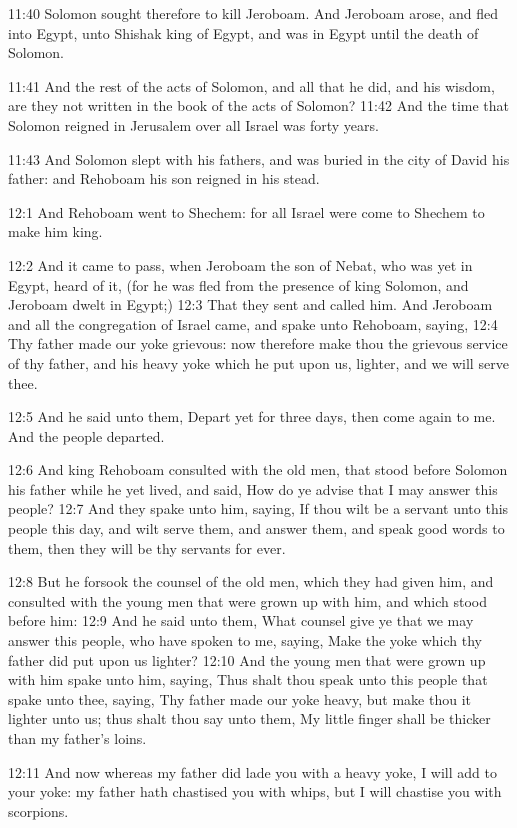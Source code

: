 11:40 Solomon sought therefore to kill Jeroboam. And Jeroboam arose,
and fled into Egypt, unto Shishak king of Egypt, and was in Egypt
until the death of Solomon.

11:41 And the rest of the acts of Solomon, and all that he did, and
his wisdom, are they not written in the book of the acts of Solomon?
11:42 And the time that Solomon reigned in Jerusalem over all Israel
was forty years.

11:43 And Solomon slept with his fathers, and was buried in the city
of David his father: and Rehoboam his son reigned in his stead.

12:1 And Rehoboam went to Shechem: for all Israel were come to Shechem
to make him king.

12:2 And it came to pass, when Jeroboam the son of Nebat, who was yet
in Egypt, heard of it, (for he was fled from the presence of king
Solomon, and Jeroboam dwelt in Egypt;) 12:3 That they sent and called
him. And Jeroboam and all the congregation of Israel came, and spake
unto Rehoboam, saying, 12:4 Thy father made our yoke grievous: now
therefore make thou the grievous service of thy father, and his heavy
yoke which he put upon us, lighter, and we will serve thee.

12:5 And he said unto them, Depart yet for three days, then come again
to me. And the people departed.

12:6 And king Rehoboam consulted with the old men, that stood before
Solomon his father while he yet lived, and said, How do ye advise that
I may answer this people?  12:7 And they spake unto him, saying, If
thou wilt be a servant unto this people this day, and wilt serve them,
and answer them, and speak good words to them, then they will be thy
servants for ever.

12:8 But he forsook the counsel of the old men, which they had given
him, and consulted with the young men that were grown up with him, and
which stood before him: 12:9 And he said unto them, What counsel give
ye that we may answer this people, who have spoken to me, saying, Make
the yoke which thy father did put upon us lighter?  12:10 And the
young men that were grown up with him spake unto him, saying, Thus
shalt thou speak unto this people that spake unto thee, saying, Thy
father made our yoke heavy, but make thou it lighter unto us; thus
shalt thou say unto them, My little finger shall be thicker than my
father's loins.

12:11 And now whereas my father did lade you with a heavy yoke, I will
add to your yoke: my father hath chastised you with whips, but I will
chastise you with scorpions.

